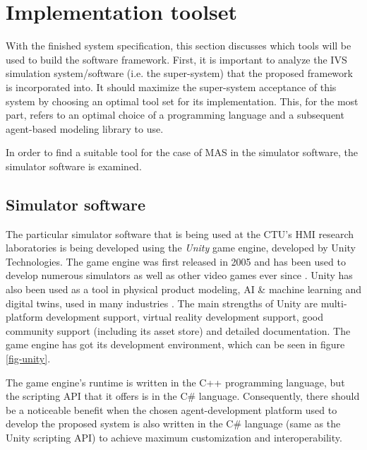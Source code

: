 \documentclass[0main.tex]{subfiles}
\begin{document}
\section{Implementation toolset}\label{sec-toolset}

With the finished system specification, this section discusses which tools will be used to build the software framework. 
First, it is important to analyze the IVS simulation system/software (i.e. the super-system) that
the proposed framework is incorporated into. It should maximize the super-system acceptance of 
this system by choosing an optimal tool set for its implementation. This, for the most part,
refers to an optimal choice of a programming language and a subsequent agent-based modeling
library to use. 

In order to find a suitable tool for the case of MAS in the simulator software, the simulator
software is examined.

\subsection{Simulator software}

The particular simulator software that is being used at the CTU's HMI research laboratories is being
developed using the \emph{Unity} game engine, developed by Unity Technologies. The game engine
was first released in 2005 and has been used to develop numerous simulators as well as other
video games ever since \cite{UnityTechnologies2022}. Unity has also been used as a tool in
physical product modeling, AI \& machine learning and digital twins, used in many industries
\cite{UnityTechnologies2022a}. The main strengths of Unity are multi-platform development
support, virtual reality development support, good community support (including its asset
store) and detailed documentation. The game engine has got its development environment, which 
can be seen in figure \ref{fig-unity}.

The game engine's runtime is written in the C++ programming language, but the scripting API
that it offers is in the C\# language. Consequently, there should be a noticeable benefit when the
chosen agent-development platform used to develop the proposed system is also written in the
C\# language (same as the Unity scripting API) to achieve maximum customization and
interoperability.
\end{document}
